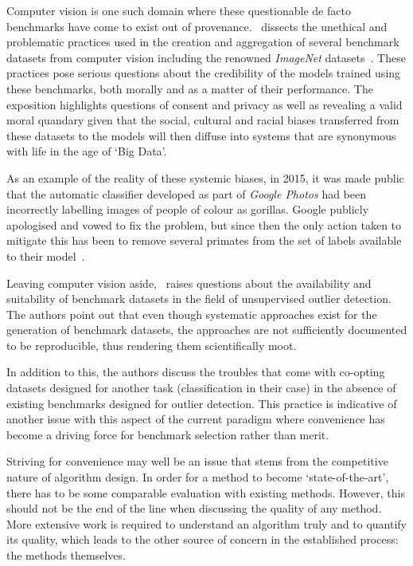 Computer vision is one such domain where these questionable de facto benchmarks
have come to exist out of provenance.~\cite{Prabhu2020} dissects the unethical
and problematic practices used in the creation and aggregation of several
benchmark datasets from computer vision including the renowned \emph{ImageNet}
datasets~\cite{Deng2009}. These practices pose serious questions about the
credibility of the models trained using these benchmarks, both morally and as a
matter of their performance. The exposition highlights questions of consent and
privacy as well as revealing a valid moral quandary given that the social,
cultural and racial biases transferred from these datasets to the models will
then diffuse into systems that are synonymous with life in the age of `Big
Data'.

As an example of the reality of these systemic biases, in 2015, it was made
public that the automatic classifier developed as part of \emph{Google Photos}
had been incorrectly labelling images of people of colour as gorillas. Google
publicly apologised and vowed to fix the problem, but since then the only action
taken to mitigate this has been to remove several primates from the set of
labels available to their model~\cite{Simonite2018}.

Leaving computer vision aside,~\cite{Campos2016} raises questions about the
availability and suitability of benchmark datasets in the field of unsupervised
outlier detection. The authors point out that even though systematic approaches
exist for the generation of benchmark datasets, the approaches are not
sufficiently documented to be reproducible, thus rendering them scientifically
moot.

In addition to this, the authors discuss the troubles that come with co-opting
datasets designed for another task (classification in their case) in the absence
of existing benchmarks designed for outlier detection. This practice is
indicative of another issue with this aspect of the current paradigm where
convenience has become a driving force for benchmark selection rather than
merit.

Striving for convenience may well be an issue that stems from the competitive
nature of algorithm design. In order for a method to become `state-of-the-art',
there has to be some comparable evaluation with existing methods. However, this
should not be the end of the line when discussing the quality of any method.
More extensive work is required to understand an algorithm truly and to quantify
its quality, which leads to the other source of concern in the established
process: the methods themselves.

